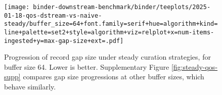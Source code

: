 \begin{figure}
\texttt{[image: binder-downstream-benchmark/binder/teeplots/2025-01-18-qos-dstream-vs-naive-steady/buffer\_size=64+font.family=serif+hue=algorithm+kind=line+palette=set2+style=algorithm+viz=relplot+x=num-items-ingested+y=max-gap-size+ext=.pdf]}
\caption{%
Progression of record gap size under steady curation strategies, for buffer size 64.
\footnotesize
Lower is better.
Supplementary Figure \ref{fig:steady-qos-supp} compares gap size progressions at other buffer sizes, which behave similarly.
}
\label{fig:steady-qos}
\end{figure}
